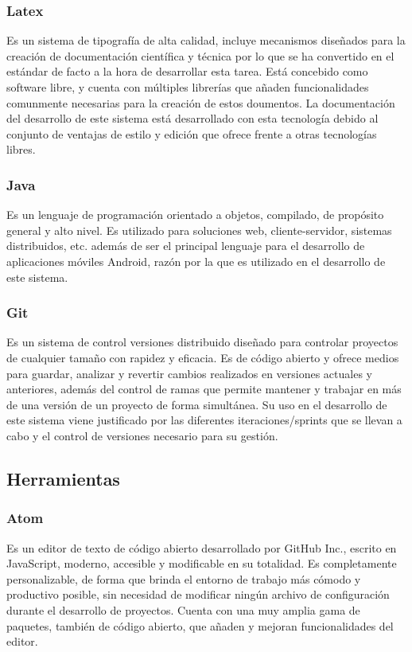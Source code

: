 \documentclass[12pt, twoside]{article}
\begin{document}
        \subsubsection{Latex} \label{sec:latex}
            Es un sistema de tipografía de alta calidad, incluye mecanismos diseñados para la creación de documentación científica y técnica por lo que se ha convertido en el estándar de facto a la hora de desarrollar esta tarea. Está concebido como software libre, y cuenta con múltiples librerías que añaden funcionalidades comunmente necesarias para la creación de estos doumentos. La documentación del desarrollo de este sistema está desarrollado con esta tecnología debido al conjunto de ventajas de estilo y edición que ofrece frente a otras tecnologías libres.

        \subsubsection{Java}
            Es un lenguaje de programación orientado a objetos, compilado, de propósito general y alto nivel. Es utilizado para soluciones web, cliente-servidor, sistemas distribuidos, etc. además de ser el principal lenguaje para el desarrollo de aplicaciones móviles Android, razón por la que es utilizado en el desarrollo de este sistema.

        \subsubsection{Git} \label{sec:git}
            Es un sistema de control versiones distribuido diseñado para controlar proyectos de cualquier tamaño con rapidez y eficacia. Es de código abierto y ofrece medios para guardar, analizar y revertir cambios realizados en versiones actuales y anteriores, además del control de ramas que permite mantener y trabajar en más de una versión de un proyecto de forma simultánea. Su uso en el desarrollo de este sistema viene justificado por las diferentes iteraciones/sprints que se llevan a cabo y el control de versiones necesario para su gestión.

    \subsection{Herramientas} 
        \subsubsection{Atom}
            Es un editor de texto de código abierto desarrollado por GitHub Inc., escrito en JavaScript, moderno, accesible y modificable en su totalidad. Es completamente personalizable, de forma que brinda el entorno de trabajo más cómodo y productivo posible, sin necesidad de modificar ningún archivo de configuración durante el desarrollo de proyectos. Cuenta con una muy amplia gama de paquetes, también de código abierto, que añaden y mejoran funcionalidades del editor.
\end{document}
